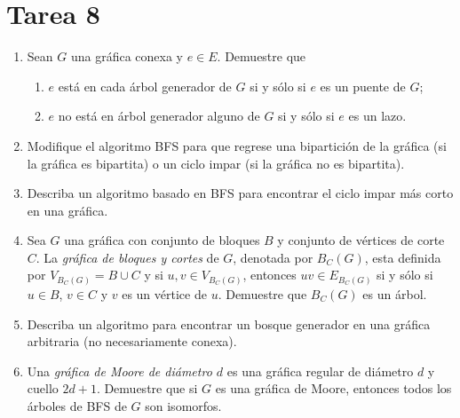 \documentclass{article}
\begin{document}
\section*{\LARGE{Tarea 8}}
\begin{enumerate}
\item Sean $G$ una gr\'afica conexa y $e \in E$.   Demuestre que
  \begin{enumerate}
  \item $e$ est\'a en cada \'arbol generador de $G$ si y s\'olo si $e$ es un puente
    de $G$;
  \item $e$ no est\'a en \'arbol generador alguno de $G$ si y s\'olo si $e$ es un lazo.
  \end{enumerate}
  
\item Modifique el algoritmo BFS para que regrese una bipartici\'on de la
  gr\'afica (si la gr\'afica es bipartita) o un ciclo impar (si la gr\'afica no es bipartita).
  
\item Describa un algoritmo basado en BFS para encontrar el ciclo impar m\'as
  corto en una gr\'afica.
  
\item Sea $G$ una gr\'afica con conjunto de bloques $B$ y conjunto de
  v\'ertices de corte $C$.   La {\em gr\'afica de bloques y cortes} de $G$,
  denotada por $B_C (G)$, esta definida por $V_{B_C (G)} = B \cup C$ y
  si $u, v \in V_{B_C (G)}$, entonces $uv \in E_{B_C (G)}$ si y s\'olo si
  $u \in B$, $v \in C$ y $v$ es un v\'ertice de $u$.   Demuestre que
  $B_C (G)$ es un \'arbol.
  
\item Describa un algoritmo para encontrar un bosque generador en una
  gr\'afica arbitraria (no necesariamente conexa).
  
\item Una {\em gr\'afica de Moore de di\'ametro $d$} es una gr\'afica
  regular de di\'ametro $d$ y cuello $2d+1$.   Demuestre que si $G$ es
  una gr\'afica de Moore, entonces todos los \'arboles de BFS de $G$
  son isomorfos.

\end{enumerate}
\end{document}
